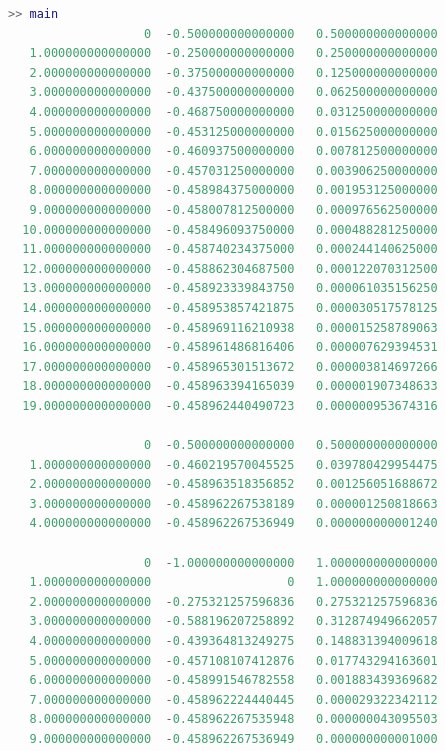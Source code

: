 



\begin{lstlisting}[language = MATLAB]
>> main
                   0  -0.500000000000000   0.500000000000000
   1.000000000000000  -0.250000000000000   0.250000000000000
   2.000000000000000  -0.375000000000000   0.125000000000000
   3.000000000000000  -0.437500000000000   0.062500000000000
   4.000000000000000  -0.468750000000000   0.031250000000000
   5.000000000000000  -0.453125000000000   0.015625000000000
   6.000000000000000  -0.460937500000000   0.007812500000000
   7.000000000000000  -0.457031250000000   0.003906250000000
   8.000000000000000  -0.458984375000000   0.001953125000000
   9.000000000000000  -0.458007812500000   0.000976562500000
  10.000000000000000  -0.458496093750000   0.000488281250000
  11.000000000000000  -0.458740234375000   0.000244140625000
  12.000000000000000  -0.458862304687500   0.000122070312500
  13.000000000000000  -0.458923339843750   0.000061035156250
  14.000000000000000  -0.458953857421875   0.000030517578125
  15.000000000000000  -0.458969116210938   0.000015258789063
  16.000000000000000  -0.458961486816406   0.000007629394531
  17.000000000000000  -0.458965301513672   0.000003814697266
  18.000000000000000  -0.458963394165039   0.000001907348633
  19.000000000000000  -0.458962440490723   0.000000953674316

                   0  -0.500000000000000   0.500000000000000
   1.000000000000000  -0.460219570045525   0.039780429954475
   2.000000000000000  -0.458963518356852   0.001256051688672
   3.000000000000000  -0.458962267538189   0.000001250818663
   4.000000000000000  -0.458962267536949   0.000000000001240

                   0  -1.000000000000000   1.000000000000000
   1.000000000000000                   0   1.000000000000000
   2.000000000000000  -0.275321257596836   0.275321257596836
   3.000000000000000  -0.588196207258892   0.312874949662057
   4.000000000000000  -0.439364813249275   0.148831394009618
   5.000000000000000  -0.457108107412876   0.017743294163601
   6.000000000000000  -0.458991546782558   0.001883439369682
   7.000000000000000  -0.458962224440445   0.000029322342112
   8.000000000000000  -0.458962267535948   0.000000043095503
   9.000000000000000  -0.458962267536949   0.000000000001000
\end{lstlisting}
